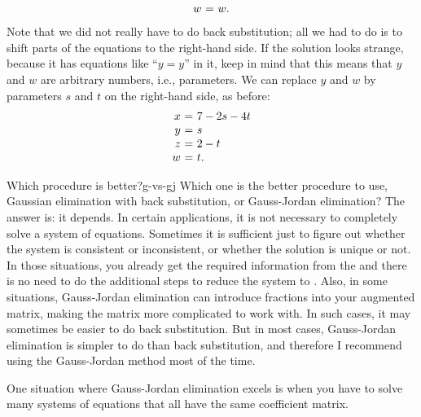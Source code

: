 \begin{solution}
\begin{equation*}
\begin{array}{r@{~}c@{~}l}
      w &=& w.
    \end{array}
  \end{equation*}
  Note that we did not really have to do back substitution; all we had
  to do is to shift parts of the equations to the right-hand side. If
  the solution looks strange, because it has equations like ``$y=y$''
  in it, keep in mind that this means that $y$ and $w$ are arbitrary
  numbers, i.e., parameters. We can replace $y$ and $w$ by parameters
  $s$ and $t$ on the right-hand side, as before:
  \begin{equation*}
    \begin{array}{r@{~}c@{~}l}
      x &=& 7-2s-4t \\
      y &=& s \\
      z &=& 2-t \\
      w &=& t.
    \end{array}
  \end{equation*}
\end{solution}

\begin{discussion}{Which procedure is better?}{g-vs-gj}
  Which one is the better procedure to use, Gaussian elimination with
  back substitution, or Gauss-Jordan elimination? The answer is: it
  depends. In certain applications, it is not necessary to completely
  solve a system of equations. Sometimes it is sufficient just to figure
  out whether the system is consistent or inconsistent, or whether the
  solution is unique or not. In those situations, you already get the
  required information from the {\ef} and there is no need to do the
  additional steps to reduce the system to {\rref}. Also, in some
  situations, Gauss-Jordan elimination can introduce fractions into your
  augmented matrix, making the matrix more complicated to work with. In
  such cases, it may sometimes be easier to do back substitution. But in
  most cases, Gauss-Jordan elimination is simpler to do than back
  substitution, and therefore I recommend using the Gauss-Jordan method
  most of the time. 
\end{discussion}

One situation where Gauss-Jordan elimination excels is when you have
to solve many systems of equations that all have the same coefficient
matrix.

